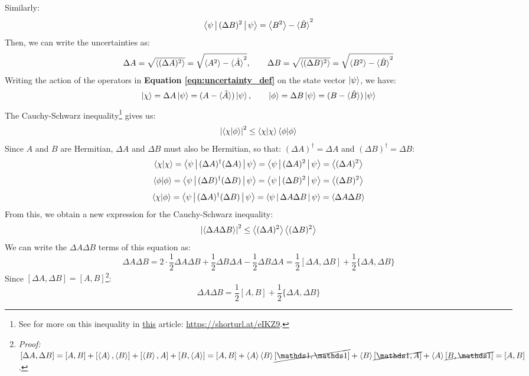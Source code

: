 Similarly:
\begin{equation}
    \Braket{\psi|(\Delta B)^2|\psi} = \left\langle B^2\right\rangle - \braket{\hat B}^2
\end{equation}
Then, we can write the uncertainties as:
\begin{equation}
    \Delta A = \sqrt{\left\langle(\Delta A)^2\right\rangle} = \sqrt{\left\langle A^2\right\rangle - \braket{\hat A}^2}, \qquad \Delta B = \sqrt{\left\langle(\Delta B)^2\right\rangle} = \sqrt{\left\langle B^2\right\rangle - \braket{\hat B}^2}
\end{equation}
Writing the action of the operators in \textbf{Equation \ref{eqn:uncertainty_def}} on the state vector $\ket{\psi}$, we have:
\begin{equation}
    \ket{\chi} = \Delta A\ket{\psi} = (A - \braket{\hat A})\ket{\psi}, \qquad \ket{\phi} = \Delta B\ket{\psi} = (B - \braket{\hat B})\ket{\psi}
\end{equation}
The Cauchy-Schwarz inequality\footnote{See for more on this inequality in \href{https://mathworld.wolfram.com/SchwarzsInequality.html}{this} article: \underline{https://shorturl.at/eIKZ9}.} gives us:
\begin{equation}
    \left|\braket{\chi|\phi}\right|^2 \leq \braket{\chi|\chi}\braket{\phi|\phi}
\end{equation}
Since $A$ and $B$ are Hermitian, $\Delta A$ and $\Delta B$ must also be Hermitian, so that: $(\Delta A)^\dagger = \Delta A$ and $(\Delta B)^\dagger = \Delta B$:
\begin{equation}
    \braket{\chi|\chi} = \Braket{\psi|(\Delta A)^\dagger(\Delta A)|\psi} = \Braket{\psi|(\Delta A)^2|\psi} = \left\langle(\Delta A)^2\right\rangle
\end{equation}
\begin{equation}
    \braket{\phi|\phi} = \Braket{\psi|(\Delta B)^\dagger(\Delta B)|\psi} = \Braket{\psi|(\Delta B)^2|\psi} = \left\langle(\Delta B)^2\right\rangle
\end{equation}
\begin{equation}
    \braket{\chi|\phi} = \Braket{\psi|(\Delta A)^\dagger(\Delta B)|\psi} = \Braket{\psi|\Delta A\Delta B|\psi} = \left\langle\Delta A\Delta B\right\rangle
\end{equation}
From this, we obtain a new expression for the Cauchy-Schwarz inequality:
\begin{equation} \label{eqn:cauchy_expected}
    \left|\Braket{\Delta A\Delta B}\right|^2 \leq \left\langle(\Delta A)^2\right\rangle\left\langle(\Delta B)^2\right\rangle
\end{equation}
We can write the $\Delta A \Delta B$ terms of this equation as:
\begin{equation}
    \Delta A \Delta B = 2\cdot \frac12\Delta A \Delta B + \frac12\Delta B \Delta A - \frac12\Delta B \Delta A = \frac12[\Delta A, \Delta B] + \frac12\{\Delta A, \Delta B\}
\end{equation}
Since $[\Delta A, \Delta B] = [A, B]$\footnote{\textit{Proof:} $[\Delta A, \Delta B] = [A, B] + [\braket{A}, \braket{B}] + [\braket{B}, A] + [B, \braket{A}] = [A, B] + \braket{A}\braket{B}\cancel{[\Imat, \Imat]} + \braket{B}\cancel{[\Imat, A]} + \braket{A}\cancel{[B, \Imat]} = [A, B]$.}:
\begin{equation}
    \Delta A \Delta B = \frac12[A, B] + \frac12\{\Delta A, \Delta B\}
\end{equation}

